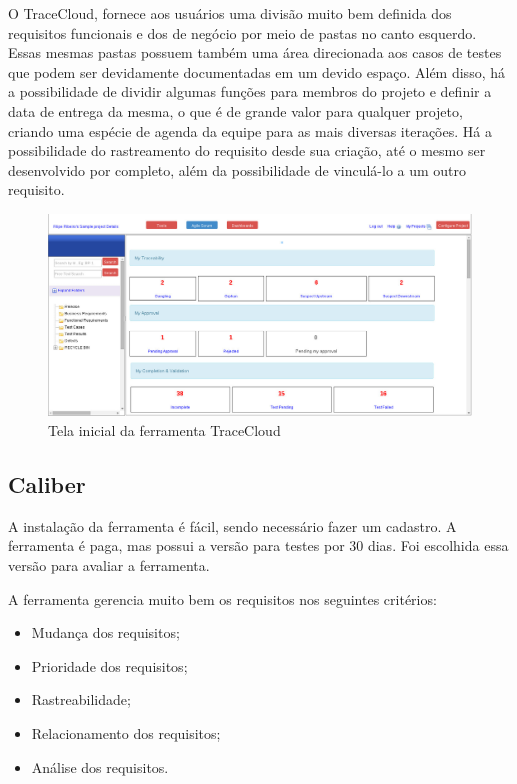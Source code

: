 O TraceCloud, fornece aos usuários uma divisão muito bem definida dos requisitos funcionais e dos de negócio por meio de pastas no canto esquerdo. Essas mesmas pastas possuem também uma área direcionada aos casos de testes que podem ser devidamente documentadas em um devido espaço.
Além disso, há a possibilidade de dividir algumas funções para membros do projeto e definir a data de entrega da mesma, o que é de grande valor para
qualquer projeto, criando uma espécie de agenda da equipe para as mais diversas iterações. Há a possibilidade do rastreamento do requisito desde sua criação,
até o mesmo ser desenvolvido por completo, além da possibilidade de vinculá-lo a um outro requisito.

\begin{figure}[!htb]
\centering
\includegraphics[scale=0.3]{figuras/trace.jpg}
\caption{Tela inicial da ferramenta TraceCloud}
\label{Rotulo}
\end{figure}

\subsection{Caliber}
A instalação da ferramenta é fácil, sendo necessário fazer um cadastro. A ferramenta é paga, mas possui a versão para testes por 30 dias.
Foi escolhida essa versão para avaliar a ferramenta.

A ferramenta gerencia muito bem os requisitos nos seguintes critérios:
\begin{itemize}
  \item Mudança dos requisitos;
  \item Prioridade dos requisitos;
  \item Rastreabilidade;
  \item Relacionamento dos requisitos;
  \item Análise dos requisitos.
\end{itemize}

